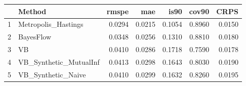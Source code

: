 \documentclass[12pt]{article}
\begin{document}
\thispagestyle{empty}
\begin{table}[ht]
\centering
\begin{tabular}{rlrrrrr}
  \hline
 & Method & rmspe & mae & is90 & cov90 & CRPS \\ 
  \hline
1 & Metropolis\_Hastings & 0.0294 & 0.0215 & 0.1054 & 0.8960 & 0.0150 \\ 
  2 & BayesFlow & 0.0348 & 0.0256 & 0.1310 & 0.8810 & 0.0180 \\ 
  3 & VB & 0.0410 & 0.0286 & 0.1718 & 0.7590 & 0.0178 \\ 
  4 & VB\_Synthetic\_MutualInf & 0.0413 & 0.0298 & 0.1643 & 0.8030 & 0.0190 \\ 
  5 & VB\_Synthetic\_Naive & 0.0410 & 0.0299 & 0.1632 & 0.8260 & 0.0195 \\ 
   \hline
\end{tabular}
\end{table}
\end{document}
